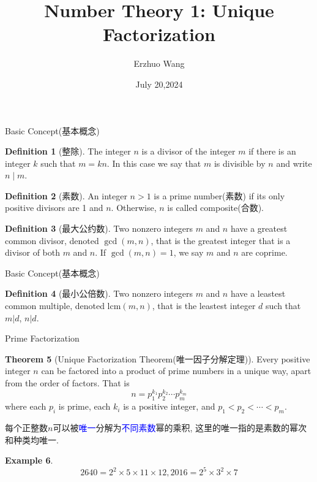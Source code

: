 \documentclass{beamer}
\title{Number Theory 1: Unique Factorization}
\institute{Youth STEM Academy}
\author{Erzhuo Wang}
\date{July 20,2024}
\theoremstyle{definition}
\newtheorem{defn}{Definition}[section]
\newtheorem{theo}[defn]{Theorem}
\newtheorem{exam}[defn]{Example}
\newcommand{\blue}[1]{\textcolor{blue}{#1}}
\begin{document}
\begin{frame}
    \titlepage
\end{frame}
\begin{frame}{Basic Concept(基本概念)}
    \begin{defn}[整除]
        The integer $n$ is a divisor of the integer $m$ if there is an integer $k$ such that $m=k n$. In this case we say that $m$ is divisible by $n$ and write $n \mid m$.
    \end{defn}
    \begin{defn}[素数]
        An integer $n>1$ is a prime number(素数)
        if its only positive divisors are 1 and $n$.
        Otherwise, $n$ is called composite(合数).
    \end{defn}
    \begin{defn}[最大公约数]
        Two nonzero integers $m$ and $n$ have a greatest common divisor, denoted $\gcd(m, n)$, that is the greatest integer that is a divisor of both $m$ and $n$. If $\gcd(m,n)=1$, we say $m$ and $n$ are coprime.
    \end{defn}
\end{frame}
\begin{frame}{Basic Concept(基本概念)}
    \begin{defn}[最小公倍数]
        Two nonzero integers $m$ and $n$ have a leastest common multiple, denoted $\text{lcm}(m,n)$, that is the leastest integer $d$ such that $m|d$, $n|d$.
    \end{defn}
\end{frame}
\begin{frame}{Prime Factorization}
    \begin{theo}[Unique Factorization Theorem(唯一因子分解定理)]
        Every positive integer $n$ can be factored into a product of prime numbers in a unique way, apart from the order of factors. That is
        $$
            n=p_1^{k_1} p_2^{k_2} \cdots p_m^{k_m}
        $$
        where each $p_i$ is prime, each $k_i$ is a positive integer, and $p_1<p_2<\cdots<p_m$.

        每个正整数$n$可以被\blue{唯一}分解为\blue{不同素数}幂的乘积, 这里的唯一指的是素数的幂次和种类均唯一.
    \end{theo}
    \begin{exam}
        \begin{equation*}
            2640= 2^2\times 5 \times 11\times 12, 2016=2^5\times 3^2 \times 7
        \end{equation*}
    \end{exam}
\end{frame}
\end{document}
